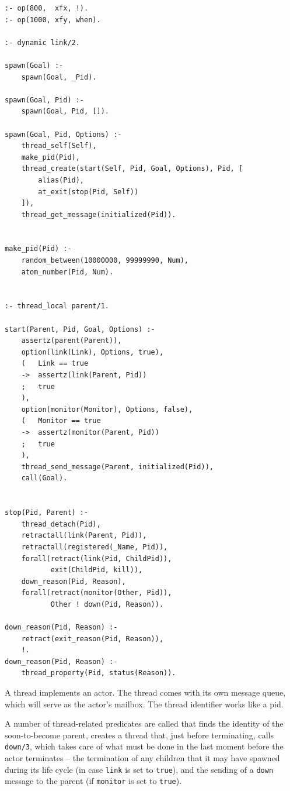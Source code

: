 \begin{verbatim}
:- op(800,  xfx, !).
:- op(1000, xfy, when).

:- dynamic link/2.

spawn(Goal) :-
    spawn(Goal, _Pid).

spawn(Goal, Pid) :-
    spawn(Goal, Pid, []).

spawn(Goal, Pid, Options) :-
    thread_self(Self),
    make_pid(Pid),
    thread_create(start(Self, Pid, Goal, Options), Pid, [
        alias(Pid),
        at_exit(stop(Pid, Self))
    ]),
    thread_get_message(initialized(Pid)).


make_pid(Pid) :-
    random_between(10000000, 99999990, Num),
    atom_number(Pid, Num).
      
   
:- thread_local parent/1.

start(Parent, Pid, Goal, Options) :-
    assertz(parent(Parent)),
    option(link(Link), Options, true),
    (   Link == true
    ->  assertz(link(Parent, Pid))
    ;   true
    ),
    option(monitor(Monitor), Options, false),
    (   Monitor == true
    ->  assertz(monitor(Parent, Pid))
    ;   true
    ),
    thread_send_message(Parent, initialized(Pid)),
    call(Goal).
                                          

stop(Pid, Parent) :-
    thread_detach(Pid),
    retractall(link(Parent, Pid)),
    retractall(registered(_Name, Pid)),
    forall(retract(link(Pid, ChildPid)), 
           exit(ChildPid, kill)),
    down_reason(Pid, Reason),
    forall(retract(monitor(Other, Pid)), 
           Other ! down(Pid, Reason)).

down_reason(Pid, Reason) :-
    retract(exit_reason(Pid, Reason)),
    !.
down_reason(Pid, Reason) :-
    thread_property(Pid, status(Reason)).
\end{verbatim}


\noindent A thread implements an actor. The thread comes with its own message queue, which will serve as the actor's mailbox. The thread identifier works like a pid.

A number of thread-related predicates are called that finds the identity of the soon-to-become parent, creates a thread that, just before terminating, calls \texttt{down/3}, which takes care of what must be done in the last moment before the actor terminates -- the termination of any children that it may have spawned during its life cycle (in case \texttt{link} is set to \texttt{true}), and the sending of a \texttt{down} message to the parent (if \texttt{monitor} is set to \texttt{true}).

